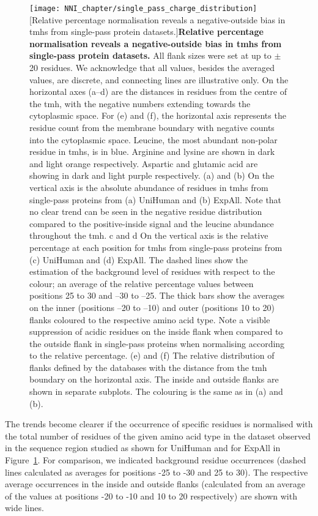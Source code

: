 \begin{figure}[p]
\centering
\texttt{[image: NNI\_chapter/single\_pass\_charge\_distribution]}
[Relative percentage normalisation reveals a negative-outside bias in \gls{tmh}s from single-pass protein datasets.]{\textbf{Relative percentage normalisation reveals a negative-outside bias in \gls{tmh}s from single-pass protein datasets.} All flank sizes were set at up to $\pm$20 residues.
We acknowledge that all values, besides the averaged values, are discrete, and connecting lines are illustrative only.
On the horizontal axes (a–d) are the distances in residues from the centre of the \gls{tmh}, with the negative numbers extending towards the cytoplasmic space.
For (e) and (f), the horizontal axis represents the residue count from the membrane boundary with negative counts into the cytoplasmic space.
Leucine, the most abundant non-polar residue in \gls{tmh}s, is in blue.
Arginine and lysine are shown in dark and light orange respectively.
Aspartic and glutamic acid are showing in dark and light purple respectively.
(a) and (b) On the vertical axis is the absolute abundance of residues in \gls{tmh}s from single-pass proteins from (a) UniHuman and (b) ExpAll.
Note that no clear trend can be seen in the negative residue distribution compared to the positive-inside signal and the leucine abundance throughout the \gls{tmh}.
c and d On the vertical axis is the relative percentage at each position for \gls{tmh}s from single-pass proteins from (c) UniHuman and (d) ExpAll.
The dashed lines show the estimation of the background level of residues with respect to the colour; an average of the relative percentage values between positions 25 to 30 and –30 to –25.
The thick bars show the averages on the inner (positions –20 to –10) and outer (positions 10 to 20) flanks coloured to the respective amino acid type.
Note a visible suppression of acidic residues on the inside flank when compared to the outside flank in single-pass proteins when normalising according to the relative percentage.
(e) and (f) The relative distribution of flanks defined by the databases with the distance from the \gls{tmh} boundary on the horizontal axis.
The inside and outside flanks are shown in separate subplots.
The colouring is the same as in (a) and (b).}


\label{fig:single_pass_charge_distribution}
\end{figure}

The trends become clearer if the occurrence of specific residues is normalised with the total number of residues of the given amino acid type in the dataset observed in the sequence region studied as shown for UniHuman and for ExpAll in Figure~\ref{fig:single_pass_charge_distribution}.
For comparison, we indicated background residue occurrences (dashed lines calculated as averages for positions -25 to -30 and 25 to 30).
The respective average occurrences in the inside and outside flanks (calculated from an average of the values at positions -20 to -10 and 10 to 20 respectively) are shown with wide lines.

